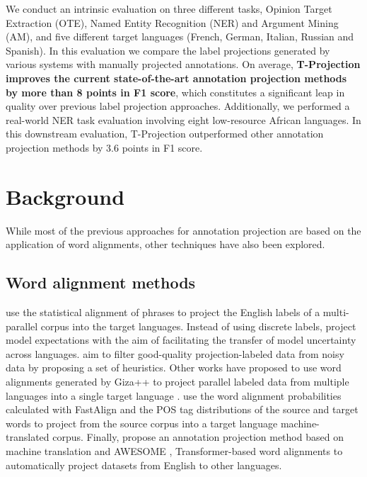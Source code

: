 \documentclass[11pt]{article}
\begin{document}
We conduct an intrinsic evaluation on three different tasks, Opinion Target Extraction (OTE), Named Entity Recognition (NER) and Argument Mining (AM), and five different target languages (French, German, Italian, Russian and Spanish). In this evaluation we compare the label projections generated by various systems with manually projected annotations. On average, \textbf{T-Projection improves the current state-of-the-art annotation projection methods by more than 8 points in F1 score}, which constitutes a significant leap in quality over previous label projection approaches. Additionally, we performed a real-world NER task evaluation involving eight low-resource African languages. In this downstream evaluation, T-Projection outperformed other annotation projection methods by 3.6 points in F1 score. 



\section{Background}\label{sec:related-work}

While most of the previous approaches for annotation projection are based on the
application of word alignments, other
techniques have also been explored. 

\subsection{Word alignment methods}



\citet{Ehrmann} use the statistical alignment of phrases to project the English
labels of a multi-parallel corpus into the target languages. Instead of using
discrete labels, \citet{wang-manning-2014-cross} project model expectations
with the aim of facilitating the transfer of model uncertainty across
languages.  \citet{ni-etal-2017-weakly} aim to filter  good-quality
projection-labeled data from noisy data by proposing a set of heuristics. Other
works have proposed to use word alignments generated by Giza++
\cite{och-ney-2003-systematic} to project parallel labeled data from multiple
languages into a single target language \cite{agerri-etal-2018-building}.
\citet{fei-etal-2020-cross} use the word alignment probabilities calculated
with FastAlign \cite{fastalign} and the POS tag distributions of the source and
target words to project from the source corpus into a target language
machine-translated corpus.  Finally, \citet{garcia-ferrero-etal-2022-model}
propose an annotation projection method based on machine translation and
AWESOME \cite{DBLP:conf/eacl/DouN21}, Transformer-based word alignments to
automatically project datasets from English to other languages. 
\end{document}
